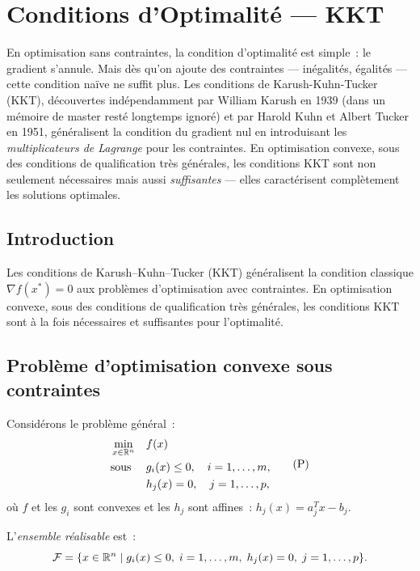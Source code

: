 \chapter{Conditions d'Optimalit\'e --- KKT}
\label{ch:kkt}

En optimisation sans contraintes, la condition d'optimalit\'e est simple~: le gradient s'annule. Mais d\`es qu'on ajoute des contraintes --- in\'egalit\'es, \'egalit\'es --- cette condition na\"ive ne suffit plus. Les conditions de Karush-Kuhn-Tucker (KKT), d\'ecouvertes ind\'ependamment par William Karush en 1939 (dans un m\'emoire de master rest\'e longtemps ignor\'e) et par Harold Kuhn et Albert Tucker en 1951, g\'en\'eralisent la condition du gradient nul en introduisant les \emph{multiplicateurs de Lagrange} pour les contraintes. En optimisation convexe, sous des conditions de qualification tr\`es g\'en\'erales, les conditions KKT sont non seulement n\'ecessaires mais aussi \emph{suffisantes} --- elles caract\'erisent compl\`etement les solutions optimales.

\section{Introduction}

Les conditions de Karush--Kuhn--Tucker (KKT) g\'en\'eralisent la condition classique
$\nabla f(x^*) = 0$ aux probl\`emes d'optimisation avec contraintes. En optimisation
convexe, sous des conditions de qualification tr\`es g\'en\'erales, les conditions KKT
sont \`a la fois n\'ecessaires et suffisantes pour l'optimalit\'e.

\section{Probl\`eme d'optimisation convexe sous contraintes}

Consid\'erons le probl\`eme g\'en\'eral~:
\[
    \begin{aligned}
        & \min_{x \in \mathbb{R}^n} && f(x) \\
        & \text{sous} && g_i(x) \leq 0, \quad i = 1, \ldots, m, \\
        & && h_j(x) = 0, \quad j = 1, \ldots, p,
    \end{aligned}
    \tag{P}
\]
o\`u $f$ et les $g_i$ sont convexes et les $h_j$ sont affines~: $h_j(x) = a_j^T x - b_j$.

\begin{definition}
L'\emph{ensemble r\'ealisable} est~:
\[
    \mathcal{F} = \{x \in \mathbb{R}^n \mid g_i(x) \leq 0, \; i=1,\ldots,m, \;
    h_j(x) = 0, \; j=1,\ldots,p\}.
\]
\end{definition}

